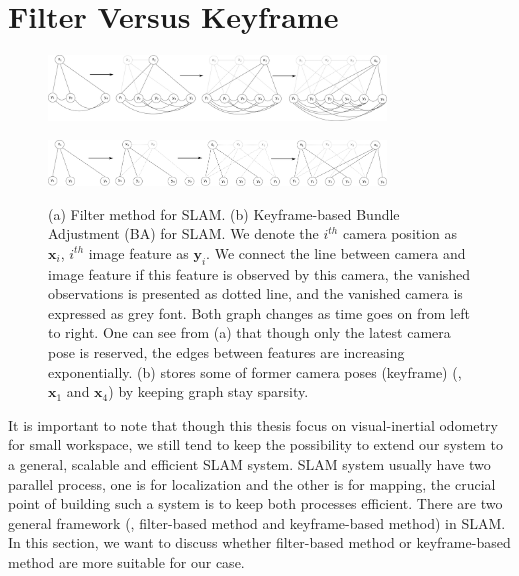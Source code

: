 \section{Filter Versus Keyframe}
\label{sec:FVK}

\begin{figure}
\centering
	\begin{subfloat}[Filter]{
		\includegraphics[width=0.8\textwidth]{CONTENT/Figure/Figure2-2-a.png}
		\label{fig:fig2-2-a}}
	\end{subfloat}
	
	
	\begin{subfloat}{
		\includegraphics[width=0.8\textwidth]{CONTENT/Figure/Figure2-2-b.png}
		\label{fig:fig2-2-b}}
	\end{subfloat}
	
	
	\caption{(a) Filter method for SLAM. (b) Keyframe-based Bundle Adjustment (BA) for SLAM. We denote the $i^{th}$ camera position as $\textbf{x}_i$,  $i^{th}$ image feature as $\textbf{y}_i$. We connect the line between camera and image feature if this feature is observed by this camera, the vanished observations is presented as dotted line, and the vanished camera is expressed as grey font. Both graph changes as time goes on from left to right. One can see from (a) that though only the latest camera pose is reserved, the edges between features are increasing exponentially. (b) stores some of former camera poses (keyframe) (\ie, $\textbf{x}_1$ and $\textbf{x}_4$) by keeping graph stay sparsity. } 
	\label{fig:fig2-2}
\end{figure}

It is important to note that though this thesis focus on visual-inertial odometry for small workspace, we still tend to keep the possibility to extend our system to a general, scalable and efficient SLAM system. SLAM system usually have two parallel process, one is for localization and the other is for mapping, the crucial point of building such a system is to keep both processes efficient. There are two general framework (\eg, filter-based method and keyframe-based method) in SLAM. In this section, we want to discuss whether filter-based method or keyframe-based method are more suitable for our case.

